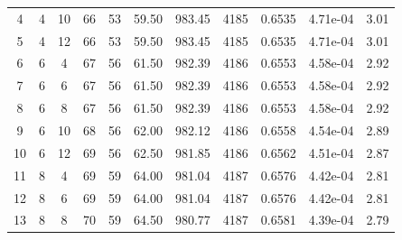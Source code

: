 {\begin{longtable}{|c|c|c|c|c|c|c|c|c|c|c|}
            4            & 4              & 10             & 66                  & 53                   & 59.50                & 983.45            & 4185               & 0.6535               & 4.71e-04         & 3.01            \\
            5            & 4              & 12             & 66                  & 53                   & 59.50                & 983.45            & 4185               & 0.6535               & 4.71e-04         & 3.01            \\ \hline
            6            & 6              & 4              & 67                  & 56                   & 61.50                & 982.39            & 4186               & 0.6553               & 4.58e-04         & 2.92            \\
            7            & 6              & 6              & 67                  & 56                   & 61.50                & 982.39            & 4186               & 0.6553               & 4.58e-04         & 2.92            \\
            8            & 6              & 8              & 67                  & 56                   & 61.50                & 982.39            & 4186               & 0.6553               & 4.58e-04         & 2.92            \\
            9            & 6              & 10             & 68                  & 56                   & 62.00                & 982.12            & 4186               & 0.6558               & 4.54e-04         & 2.89            \\
            10           & 6              & 12             & 69                  & 56                   & 62.50                & 981.85            & 4186               & 0.6562               & 4.51e-04         & 2.87            \\ \hline
            11           & 8              & 4              & 69                  & 59                   & 64.00                & 981.04            & 4187               & 0.6576               & 4.42e-04         & 2.81            \\
            12           & 8              & 6              & 69                  & 59                   & 64.00                & 981.04            & 4187               & 0.6576               & 4.42e-04         & 2.81            \\
            13           & 8              & 8              & 70                  & 59                   & 64.50                & 980.77            & 4187               & 0.6581               & 4.39e-04         & 2.79            \\

\end{longtable}}
